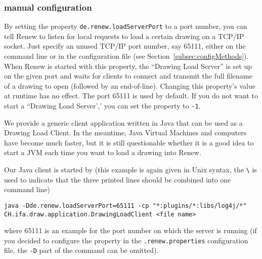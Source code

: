 \subsubsection{manual configuration}


By setting the property \texttt{de.renew.loadServerPort} to a port
number, you can tell Renew to listen for local requests to load
a certain drawing on a TCP/IP socket. Just specify an unused
TCP/IP port number, say 65111, either on the command line or in the
configuration file (see Section~\ref{subsec:configMethods}).
When Renew is started with this property,
the ``Drawing Load Server'' is set up on the given
port and waits for clients to connect and transmit the
full filename of a drawing to open (followed by an
end-of-line).
Changing this property's value at runtime has no effect.
The port 65111 is used by default. If you do not want to start
a ``Drawing Load Server',' you can set the property to \texttt{-1}.

We provide a generic client application written in
Java that can be used as a Drawing Load Client. In the meantime,
Java Virtual Machines and computers have become much faster, but it
is still questionable whether it is a good idea to start a JVM each
time you want to load a drawing into Renew.

Our Java client is started by
(this example is again given in Unix syntax, the \verb:\: is used to
indicate that the three printed lines should be combined into one
command line)
\begin{lstlisting}[style=xnonfloating]
  java -Dde.renew.loadServerPort=65111 -cp "*:plugins/*:libs/log4j/*" CH.ifa.draw.application.DrawingLoadClient <file name>
\end{lstlisting}

where 65111 is an example for the port number on which the server
is running 
(if you decided to configure the property in the
\texttt{.renew.properties} configuration file, the \texttt{-D} part of
the command can be omitted).





